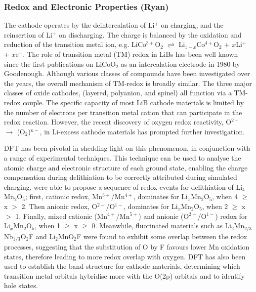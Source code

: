 \documentclass[../main.tex]{subfiles}
\begin{document}
\subsubsection{Redox and Electronic Properties (Ryan)}
The cathode operates by the deintercalation of Li$^+$ on charging, and the reinsertion of Li$^+$ on discharging. The charge is balanced by the oxidation and reduction of the transition metal ion, e.g. LiCo$^{3+}$O$_2$ $\rightleftharpoons$ Li$_{1-x}$Co$^{4+}$O$_2$ + $x$Li$^+$ + $x$e$^-$. 
The role of transition metal (TM) redox in LiBs has been well known since the first publications on LiCoO$_2$ as an intercalation electrode in 1980 by Goodenough.\cite{mizushima1980lixcoo2} Although various classes of compounds have been investigated over the years, the overall mechanism of TM-redox is broadly similar. The three major classes of oxide cathodes, (layered,\cite{mizushima1980lixcoo2} polyanion,\cite{padhi1997olivine} and spinel\cite{Thackeray1983}) all function via a TM-redox couple. The specific capacity of most LiB cathode materials is limited by the number of electrons per transition metal cation that can participate in the redox reaction. However, the recent discovery of oxygen redox reactivity, O$^{2-}$ $\to$ (O$_2$)$^{n-}$,  in Li-excess cathode materials\cite{Koga2013, Sathiya2013, Oishi2015, Sathiya2015, McCalla2015, Cao2015, Shimoda2016, Chen2016, Luo2016a, Hy2016, Muhammad2016, Seo2016, Gent2017, Zhan2017,  Zheng2017,Assat2018, BenYahia2019, naylor2019depth, Hua2019, House2020, Li2019, Eum2020, Gent2020, Sharpe2020} has prompted further investigation.

DFT has been pivotal in shedding light on this phenomenon, in conjunction with a range of experimental techniques. This technique can be used to analyse the atomic charge and electronic structure of each ground state, enabling the charge compensation during delithiation to be correctly attributed during simulated charging. \citeauthor{Yao2018} were able to propose a sequence of redox events for delithiation of Li$_4$Mn$_2$O$_5$;\cite{Yao2018} first, cationic redox, Mn$^{3+}$/Mn$^{4+}$, dominates for Li$_x$Mn$_2$O$_5$, when 4 $\geq$ x $>$ 2. Then anionic redox, O$^{2-}$/O$^{1-}$, dominates for Li$_x$Mn$_2$O$_5$, when 2 $\geq$ x $>$ 1. Finally, mixed cationic (Mn$^{4+}$/Mn$^{5+}$) and anionic (O$^{2-}$/O$^{1-}$) redox for Li$_x$Mn$_2$O$_5$, when 1 $\geq$ x $\geq$ 0. Meanwhile, fluorinated materials such as Li$_2$Mn$_{2/3}$Nb$_{1/3}$O$_2$F\cite{Lee2018} and Li$_2$MnO$_2$F\cite{Sharpe2020} were found to exhibit some overlap between the redox processes, suggesting that the substitution of O by F favours lower Mn oxidation states, therefore leading to more redox overlap with oxygen. DFT has also been used to establish the band structure for cathode materials, determining which transition metal orbitals hybridise more with the O(2p) orbitals\cite{Cao2015, Sathiya2013a} and to identify hole states.\cite{Zhan2017, Xiao2012}
\end{document}
